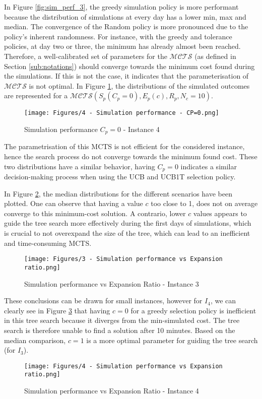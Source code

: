 In Figure \ref{fig:sim_perf_3}, the greedy simulation policy is more performant because the distribution of simulations at every day has a lower min, max and median.
The convergence of the Random policy is more pronounced due to the policy's inherent randomness. For instance, with the greedy and tolerance policies, at day two or three, the minimum has already almost been reached. Therefore, a well-calibrated set of parameters for the $\mathcal{MCTS}$ (as defined in Section \ref{sub:notations}) should converge towards the minimum cost found during the simulations. If this is not the case, it indicates that the parameterisation of $\mathcal{MCTS}$ is not optimal. In Figure \ref{fig:sim_perf_4_cp_zero}, the distributions of the simulated outcomes are represented for a  $\mathcal{MCTS}(S_p(C_p=0),E_p(c),R_p,N_c=10)$.


\begin{figure}[!ht]
    \centering
    \texttt{[image: Figures/4 - Simulation performance - CP=0.png]}
    \caption{Simulation performance $C_p=0$ - Instance 4}
    \label{fig:sim_perf_4_cp_zero}
\end{figure}
The parametrisation of this MCTS is not efficient for the considered instance, hence the search process do not converge towards the minimum found cost. These two distributions have a similar behavior, having $C_p=0$ indicates a similar decision-making process when using the UCB and UCB1T selection policy.

In Figure \ref{fig:sim_perf_vs_c_3}, the median distributions for the different scenarios have been plotted. One can observe that having a value $c$ too close to 1, does not on average converge to this minimum-cost solution. A contrario, lower $c$ values appears to guide the tree search more effectively during the first days of simulations, which is crucial to not overexpand the size of the tree, which can lead to an inefficient and time-consuming MCTS.
\begin{figure}[!ht]
    \centering
    \texttt{[image: Figures/3 - Simulation performance vs Expansion ratio.png]}
    \caption{Simulation performance vs Expansion Ratio - Instance 3}
    \label{fig:sim_perf_vs_c_3}
\end{figure}

These conclusions can be drawn for small instances, however for $I_4$, we can clearly see in Figure \ref{fig:sim_perf_vs_c_4} that having $c=0$ for a greedy selection policy is inefficient in this tree search because it diverges from the min-simulated cost. The tree search is therefore unable to find a solution after 10 minutes. Based on the median comparison, $c=1$ is a more optimal parameter for guiding the tree search (for $I_3$).
\begin{figure}[!ht]
    \centering
    \texttt{[image: Figures/4 - Simulation performance vs Expansion ratio.png]}
    \caption{Simulation performance vs Expansion Ratio - Instance 4}
    \label{fig:sim_perf_vs_c_4}
\end{figure}

